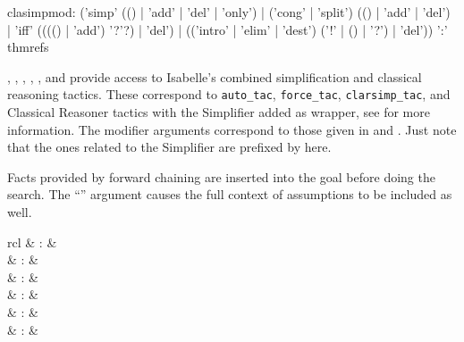\begin{isabellebody}
\begin{isamarkuptext}
\begin{rail}
    clasimpmod: ('simp' (() | 'add' | 'del' | 'only') |
      ('cong' | 'split') (() | 'add' | 'del') |
      'iff' (((() | 'add') '?'?) | 'del') |
      (('intro' | 'elim' | 'dest') ('!' | () | '?') | 'del')) ':' thmrefs
  \end{rail}

  \begin{descr}

  \item [\mbox{\isa{auto}}, \mbox{\isa{force}}, \mbox{\isa{clarsimp}}, \mbox{\isa{fastsimp}}, \mbox{\isa{slowsimp}}, and \mbox{\isa{bestsimp}}] provide
  access to Isabelle's combined simplification and classical reasoning
  tactics.  These correspond to \verb|auto_tac|, \verb|force_tac|, \verb|clarsimp_tac|, and Classical Reasoner tactics with the Simplifier
  added as wrapper, see \cite[\S11]{isabelle-ref} for more
  information.  The modifier arguments correspond to those given in
   and .  Just note that
  the ones related to the Simplifier are prefixed by 
  here.

  Facts provided by forward chaining are inserted into the goal before
  doing the search.  The ``\isa{{\isachardoublequote}{\isacharbang}{\isachardoublequote}}'' argument causes the full
  context of assumptions to be included as well.

  \end{descr}%
\end{isamarkuptext}%
\isamarkuptrue%
%
\isamarkuptrue%
%
\begin{isamarkuptext}%
\begin{matharray}{rcl}
    \mbox{}\isa{{\isachardoublequote}\isactrlsup {\isacharasterisk}{\isachardoublequote}} & : &  \\
    \mbox{} & : & \isaratt \\
    \mbox{} & : & \isaratt \\
    \mbox{} & : & \isaratt \\
    \mbox{} & : & \isaratt \\
    \mbox{} & : & \isaratt \\
  \end{matharray}


\end{isamarkuptext}
\end{isabellebody}
